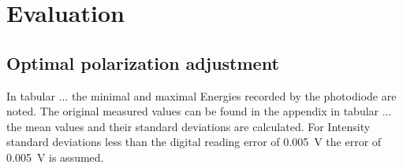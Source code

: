 \section{Evaluation}


\subsection{Optimal polarization adjustment}
In tabular ... the minimal and maximal Energies recorded by the photodiode are
noted. The original measured values can be found in the appendix in tabular ...
the mean values and their standard deviations are calculated. For Intensity
standard deviations less than the digital reading error of \qty{0.005}{\volt}
the error of \qty{0.005}{\volt} is assumed.

